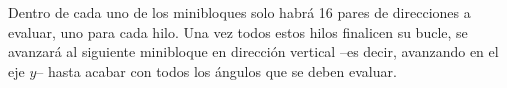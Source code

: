 Dentro de cada uno de los minibloques solo habrá 16 pares de direcciones a evaluar, uno para cada hilo.
Una vez todos estos hilos finalicen su bucle, se avanzará al siguiente minibloque en dirección vertical --es decir, avanzando en el eje $y$-- hasta acabar con todos los ángulos que se deben evaluar.




